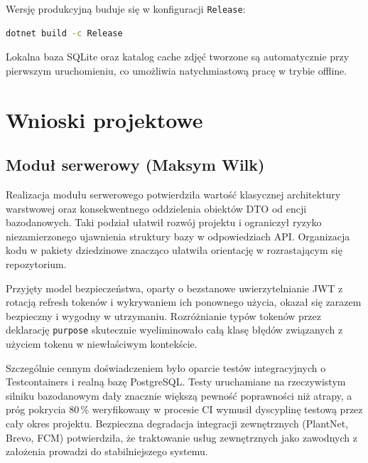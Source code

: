\documentclass[12pt,a4paper]{article}
\begin{document}
Wersj\k{e} produkcyjn\k{a} buduje si\k{e} w konfiguracji \texttt{Release}:

\begin{lstlisting}[language=bash, numbers=none]
dotnet build -c Release
\end{lstlisting}

Lokalna baza SQLite oraz katalog cache zdj\k{e}\'c tworzone s\k{a} automatycznie przy pierwszym uruchomieniu, co umo\.zliwia natychmiastow\k{a} prac\k{e} w trybie offline.

\section{Wnioski projektowe}

\subsection{Modu\l{} serwerowy (Maksym Wilk)}

Realizacja modu\l{}u serwerowego potwierdzi\l{}a warto\'s\'c klasycznej architektury warstwowej oraz konsekwentnego oddzielenia obiekt\'ow DTO od encji bazodanowych. Taki podzia\l{} u\l{}atwi\l{} rozw\'oj projektu i ograniczy\l{} ryzyko niezamierzonego ujawnienia struktury bazy w odpowiedziach API. Organizacja kodu w pakiety dziedzinowe znacz\k{a}co u\l{}atwi\l{}a orientacj\k{e} w rozrastaj\k{a}cym si\k{e} repozytorium.

Przyj\k{e}ty model bezpiecze\'nstwa, oparty o bezstanowe uwierzytelnianie JWT z rotacj\k{a} refresh token\'ow i wykrywaniem ich ponownego u\.zycia, okaza\l{} si\k{e} zarazem bezpieczny i wygodny w utrzymaniu. Rozr\'o\.znianie typ\'ow token\'ow przez deklaracj\k{e} \texttt{purpose} skutecznie wyeliminowa\l{}o ca\l{}\k{a} klas\k{e} b\l{}\k{e}d\'ow zwi\k{a}zanych z u\.zyciem tokenu w niew\l{}a\'sciwym kontek\'scie.

Szczeg\'olnie cennym do\'swiadczeniem by\l{}o oparcie test\'ow integracyjnych o Testcontainers i realn\k{a} baz\k{e} PostgreSQL. Testy uruchamiane na rzeczywistym silniku bazodanowym da\l{}y znacznie wi\k{e}ksz\k{a} pewno\'s\'c poprawno\'sci ni\.z atrapy, a pr\'og pokrycia 80\,\% weryfikowany w procesie CI wymusi\l{} dyscyplin\k{e} testow\k{a} przez ca\l{}y okres projektu. Bezpieczna degradacja integracji zewn\k{e}trznych (PlantNet, Brevo, FCM) potwierdzi\l{}a, \.ze traktowanie us\l{}ug zewn\k{e}trznych jako zawodnych z za\l{}o\.zenia prowadzi do stabilniejszego systemu.
\end{document}
